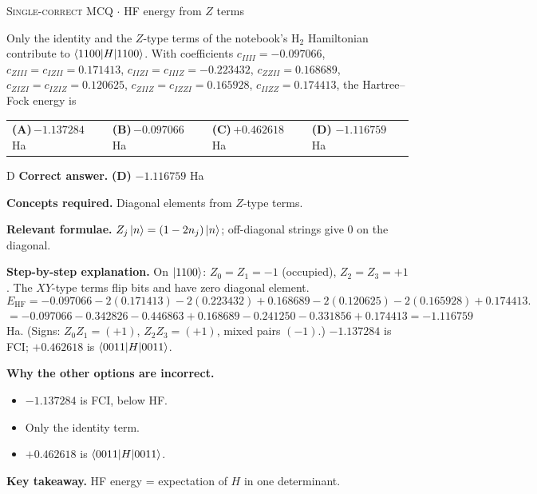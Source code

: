 \documentclass[11pt,a4paper]{article}
\newcommand{\optlabel}[1]{\textbf{(#1)}}
\newcommand{\correctlabel}[1]{\textcolor{okgreen}{\textbf{(#1)}\,\ding{51}}}
\newenvironment{qitem}[1]{\begin{list}{}{\setlength{\leftmargin}{3.3em}\setlength{\labelwidth}{3.1em}%
  \setlength{\labelsep}{0.2em}\setlength{\topsep}{3pt}\setlength{\parsep}{3pt}}\item[\textbf{Q.#1}\hfill]}{\end{list}}
\newcommand{\qsep}{\par\vspace{2pt}{\color{black!15}\hrule}\vspace{4pt}}
\newcommand{\qmeta}[2]{{\footnotesize\color{black!60}\textsc{#1} \;$\cdot$\; #2}\par}
\begin{document}
\begin{qitem}{48}
\qmeta{Single-correct MCQ}{HF energy from $Z$ terms}
Only the identity and the $Z$-type terms of the notebook's H$_2$ Hamiltonian contribute to $\braket{1100|H|1100}$. With coefficients
$c_{IIII} = -0.097066$, $c_{ZIII} = c_{IZII} = 0.171413$, $c_{IIZI} = c_{IIIZ} = -0.223432$, $c_{ZZII} = 0.168689$, $c_{ZIZI} = c_{IZIZ} = 0.120625$,
$c_{ZIIZ} = c_{IZZI} = 0.165928$, $c_{IIZZ} = 0.174413$, the Hartree--Fock energy is
\par\smallskip\noindent\begin{tabularx}{\linewidth}{@{}*{4}{L}@{}}
\optlabel{A}\,$-1.137284$ Ha & \optlabel{B}\,$-0.097066$ Ha & \optlabel{C}\,$+0.462618$ Ha & \correctlabel{D}\,$-1.116759$ Ha
\end{tabularx}
\end{qitem}
\begin{solbox}{D}
\textbf{\color{brand}Correct answer.} \textcolor{okgreen}{\textbf{(D)}} $-1.116759$ Ha

\textbf{\color{brand}Concepts required.} Diagonal elements from $Z$-type terms.

\textbf{\color{brand}Relevant formulae.} $Z_j\ket{n} = (1 - 2n_j)\ket n$; off-diagonal strings give 0 on the diagonal.

\textbf{\color{brand}Step-by-step explanation.} On $\ket{1100}$: $Z_0 = Z_1 = -1$ (occupied), $Z_2 = Z_3 = +1$. The $XY$-type terms flip bits and have zero diagonal element.
\[ E_{\mathrm{HF}} = -0.097066 - 2(0.171413) - 2(0.223432) + 0.168689 - 2(0.120625) - 2(0.165928) + 0.174413 . \]
$= -0.097066 - 0.342826 - 0.446863 + 0.168689 - 0.241250 - 0.331856 + 0.174413 = -1.116759$ Ha.
(Signs: $Z_0Z_1 = (+1)$, $Z_2Z_3 = (+1)$, mixed pairs $(-1)$.) $-1.137284$ is FCI; $+0.462618$ is $\braket{0011|H|0011}$.

\textbf{\color{brand}Why the other options are incorrect.}
\begin{itemize}[leftmargin=2.4em, itemsep=1pt, topsep=2pt]
\item[\textbf{(A)}] $-1.137284$ is FCI, below HF.
\item[\textbf{(B)}] Only the identity term.
\item[\textbf{(C)}] $+0.462618$ is $\braket{0011|H|0011}$.
\end{itemize}
\textbf{\color{brand}Key takeaway.} HF energy = expectation of $H$ in one determinant.
\end{solbox}
\qsep
\end{document}
